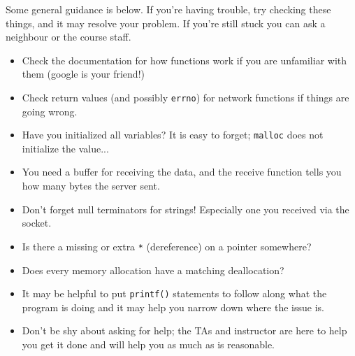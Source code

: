 Some general guidance is below. If you're having trouble, try checking these things, and it may resolve your problem. If you're still stuck you can ask a neighbour or the course staff.
\begin{itemize}
	\item Check the documentation for how functions work if you are unfamiliar with them (google is your friend!)
	\item Check return values (and possibly \texttt{errno}) for network functions if things are going wrong.  
	\item Have you initialized all variables? It is easy to forget; \texttt{malloc} does not initialize the value...
	\item You need a buffer for receiving the data, and the receive function tells you how many bytes the server sent.
	\item Don't forget null terminators for strings! Especially one you received via the socket.
	\item Is there a missing or extra \texttt{*} (dereference) on a pointer somewhere?
	\item Does every memory allocation have a matching deallocation?
	\item It may be helpful to put \texttt{printf()} statements to follow along what the program is doing and it may help you narrow down where the issue is.
	\item Don't be shy about asking for help; the TAs and instructor are here to help you get it done and will help you as much as is reasonable.
\end{itemize}




